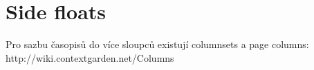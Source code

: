 \section{Side floats}

Pro sazbu časopisů do více sloupců existují columnsets a page columns:
http://wiki.contextgarden.net/Columns

